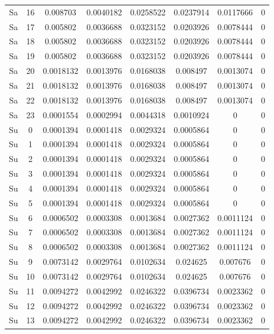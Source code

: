 \begin{center}
\begin{longtable}{cccccccc}
     Sa & 16 & 0.008703 & 0.0040182 & 0.0258522 & 0.0237914 & 0.0117666 & 0 \\  
     Sa & 17 & 0.005802 & 0.0036688 & 0.0323152 & 0.0203926 & 0.0078444 & 0 \\  
     Sa & 18 & 0.005802 & 0.0036688 & 0.0323152 & 0.0203926 & 0.0078444 & 0 \\  
     Sa & 19 & 0.005802 & 0.0036688 & 0.0323152 & 0.0203926 & 0.0078444 & 0 \\  
     Sa & 20 & 0.0018132 & 0.0013976 & 0.0168038 & 0.008497 & 0.0013074 & 0 \\  
     Sa & 21 & 0.0018132 & 0.0013976 & 0.0168038 & 0.008497 & 0.0013074 & 0 \\  
     Sa & 22 & 0.0018132 & 0.0013976 & 0.0168038 & 0.008497 & 0.0013074 & 0 \\  
     Sa & 23 & 0.0001554 & 0.0002994 & 0.0044318 & 0.0010924 & 0 & 0 \\  
     Su & 0 & 0.0001394 & 0.0001418 & 0.0029324 & 0.0005864 & 0 & 0 \\  
     Su & 1 & 0.0001394 & 0.0001418 & 0.0029324 & 0.0005864 & 0 & 0 \\  
     Su & 2 & 0.0001394 & 0.0001418 & 0.0029324 & 0.0005864 & 0 & 0 \\  
     Su & 3 & 0.0001394 & 0.0001418 & 0.0029324 & 0.0005864 & 0 & 0 \\  
     Su & 4 & 0.0001394 & 0.0001418 & 0.0029324 & 0.0005864 & 0 & 0 \\  
     Su & 5 & 0.0001394 & 0.0001418 & 0.0029324 & 0.0005864 & 0 & 0 \\  
     Su & 6 & 0.0006502 & 0.0003308 & 0.0013684 & 0.0027362 & 0.0011124 & 0 \\  
     Su & 7 & 0.0006502 & 0.0003308 & 0.0013684 & 0.0027362 & 0.0011124 & 0 \\  
     Su & 8 & 0.0006502 & 0.0003308 & 0.0013684 & 0.0027362 & 0.0011124 & 0 \\  
     Su & 9 & 0.0073142 & 0.0029764 & 0.0102634 & 0.024625 & 0.007676 & 0 \\  
     Su & 10 & 0.0073142 & 0.0029764 & 0.0102634 & 0.024625 & 0.007676 & 0 \\  
     Su & 11 & 0.0094272 & 0.0042992 & 0.0246322 & 0.0396734 & 0.0023362 & 0 \\  
     Su & 12 & 0.0094272 & 0.0042992 & 0.0246322 & 0.0396734 & 0.0023362 & 0 \\  
     Su & 13 & 0.0094272 & 0.0042992 & 0.0246322 & 0.0396734 & 0.0023362 & 0 \\  

\end{longtable}
\end{center}
